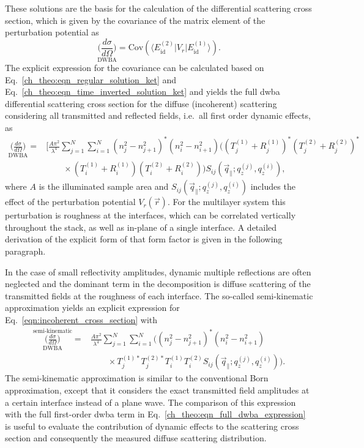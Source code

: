 These solutions are the basis for the calculation of the differential scattering cross section, which is given by the covariance of the matrix element of the perturbation potential \cite{pietsch_high-resolution_2004} as
\begin{equation}
        \underset{\text{DWBA}}{\Big(\frac{d \sigma}{d \Omega}\Big)}= \text{Cov}(\langle E_{\text{id}}^{(2)}| V_r|E_{\text{id}}^{(1)}\rangle)\text{.} \label{eqn:incoherent_cross_section} 
\end{equation}
The explicit expression for the covariance can be calculated based on Eq.~\eqref{ch_theo:eqn_regular_solution_ket} and Eq.~\eqref{ch_theo:eqn_time_inverted_solution_ket} and yields the full \gls{dwba} differential scattering cross section for the diffuse (incoherent) scattering considering all transmitted and reflected fields, i.e.~all first order dynamic effects, as
\begin{align}
        {\underset{\text{DWBA}}{\Big(\frac{d \sigma}{d \Omega}\Big)}} = &\Bigg[\frac{A \pi^2}{\lambda^4}\sum \limits_{j=1}^{N}\sum \limits_{i=1}^{N} (n_j^2 - n_{j+1}^2)^* (n_i^2 - n_{i+1}^2)\Big( (T^{(1)}_j + R^{(1)}_j)^* (T^{(2)}_j + R^{(2)}_j)^* \nonumber \\ &\qquad\times(T^{(1)}_i + R^{(1)}_i) (T^{(2)}_i + R^{(2)}_i) \Big) S_{ij}(\vec{q}_\parallel; q_z^{(j)}, q_z^{(i)}) \text{,} \label{ch_theo:eqn_full_dwba_expression}
\end{align}
where $A$ is the illuminated sample area and $S_{ij}(\vec{q}_\parallel; q_z^{(j)}, q_z^{(i)})$ includes the effect of the perturbation potential $V_r(\vec{r})$. For the multilayer system this perturbation is roughness at the interfaces, which can be correlated vertically throughout the stack, as well as in-plane of a single interface. A detailed derivation of the explicit form of that form factor is given in the following paragraph.

In the case of small reflectivity amplitudes, dynamic multiple reflections are often neglected and the dominant term in the decomposition is diffuse scattering of the transmitted fields at the roughness of each interface. The so-called semi-kinematic approximation \cite{sinha_x-ray_1988} yields an explicit expression for Eq.~\eqref{eqn:incoherent_cross_section} with
\begin{align}
                \overset{\text{semi-kinematic}}{\underset{\text{DWBA}}{\Big(\frac{d \sigma}{d \Omega}\Big)}} = &\frac{A \pi^2}{\lambda^4}\sum \limits_{j=1}^{N}\sum \limits_{i=1}^{N} \Big((n_j^2 - n_{j+1}^2)^* (n_i^2 - n_{i+1}^2) \nonumber \\ &\qquad\times T^{(1)*}_j T^{(2)*}_j T^{(1)}_i T^{(2)}_i S_{ij}(\vec{q}_\parallel; q_z^{(j)}, q_z^{(i)})\Big)\text{.} \label{ch_theo:eqn_semi_kinematic_dwba_expression} 
\end{align}
The semi-kinematic approximation is similar to the conventional Born approximation, except that it considers the exact transmitted field amplitudes at a certain interface instead of a plane wave. The comparison of this expression with the full first-order \gls{dwba} term in Eq.~\eqref{ch_theo:eqn_full_dwba_expression} is useful to evaluate the contribution of dynamic effects to the scattering cross section and consequently the measured diffuse scattering distribution.

